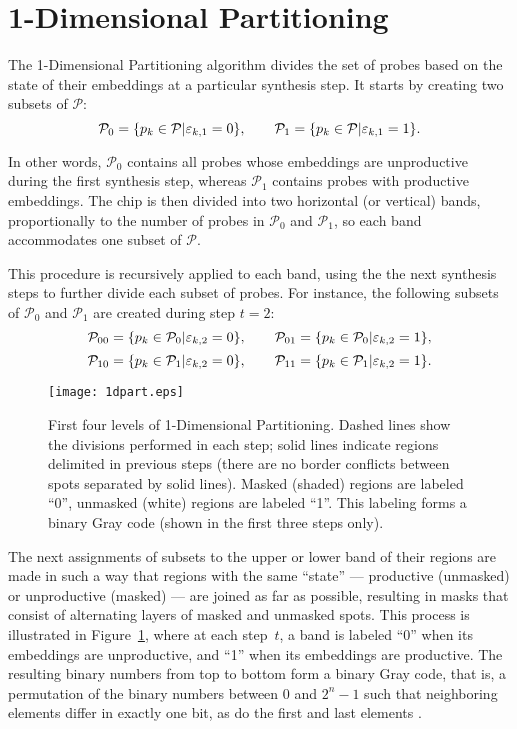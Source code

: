 \section{1-Dimensional Partitioning}
\label{sec:part_1d}

The 1-Dimensional Partitioning algorithm \citep{Carvalho2007} divides the set of
probes based on the state of their embeddings at a particular synthesis step. It
starts by creating two subsets of $\mathcal{P}$:
\[
\mathcal{P}_0 = \{ p_k \in \mathcal{P} | \varepsilon_{k,1} = 0 \},
\qquad
\mathcal{P}_1 = \{ p_k \in \mathcal{P} | \varepsilon_{k,1} = 1 \}.
\]

In other words, $\mathcal{P}_0$ contains all probes whose embeddings are
unproductive during the first synthesis step, whereas $\mathcal{P}_1$ contains
probes with productive embeddings. The chip is then divided into two horizontal
(or vertical) bands, proportionally to the number of probes in $\mathcal{P}_0$
and $\mathcal{P}_1$, so each band accommodates one subset of $\mathcal{P}$.

This procedure is recursively applied to each band, using the the next synthesis
steps to further divide each subset of probes. For instance, the following
subsets of $\mathcal{P}_0$ and $\mathcal{P}_1$ are created during step $t=2$:
\[
\mathcal{P}_{00} = \{ p_k \in \mathcal{P}_0 | \varepsilon_{k,2} = 0 \},
\qquad
\mathcal{P}_{01} = \{ p_k \in \mathcal{P}_0 | \varepsilon_{k,2} = 1 \},
\]
\[
\mathcal{P}_{10} = \{ p_k \in \mathcal{P}_1 | \varepsilon_{k,2} = 0 \},
\qquad
\mathcal{P}_{11} = \{ p_k \in \mathcal{P}_1 | \varepsilon_{k,2} = 1 \}.
\]

\begin{figure}\centering
\texttt{[image: 1dpart.eps]}
\caption{\label{fig:1dpart}%
  First four levels of 1-Dimensional Partitioning. Dashed lines show the
  divisions performed in each step; solid lines indicate regions delimited in
  previous steps (there are no border conflicts between spots separated by
  solid lines). Masked (shaded) regions are labeled ``0'',
  unmasked (white) regions are labeled ``1''. This labeling forms
  a binary Gray code (shown in the first three steps only).}
\end{figure}

The next assignments of subsets to the upper or lower band of their regions are
made in such a way that regions with the same ``state'' --- productive
(unmasked) or unproductive (masked) --- are joined as far as possible, resulting
in masks that consist of alternating layers of masked and unmasked spots. This
process is illustrated in Figure~\ref{fig:1dpart}, where at each step~$t$, a
band is labeled ``0'' when its embeddings are unproductive, and ``1'' when its
embeddings are productive. The resulting binary numbers from top to bottom form
a binary Gray code, that is, a permutation of the binary numbers between 0 and
$2^n - 1$ such that neighboring elements differ in exactly one bit, as do the
first and last elements \citep{Kreher1999}.

